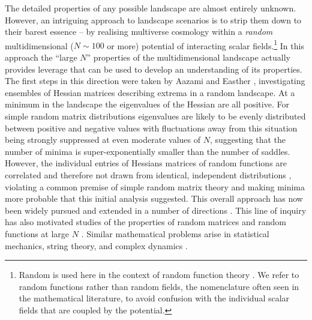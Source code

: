 \documentclass[12pt]{article}
\begin{document}
The detailed properties of any possible landscape are almost entirely unknown.  However, an intriguing approach to landscape scenarios is to strip them down to their barest essence -- by realising multiverse cosmology within a {\em random\/} multidimensional ($N\sim100$ or more) potential of interacting scalar fields.\footnote{Random is used here in the  context of random function theory \cite{GRF1, GRF2, GRF3}.  We refer to random functions rather than random fields, the nomenclature often seen in the mathematical literature, to avoid confusion with the individual scalar fields that are coupled by the potential.}  In this approach the ``large $N$'' properties of the multidimensional landscape actually provides leverage that can be used to develop an understanding of its properties. The first steps in this direction were taken by Aazami and Easther \cite{Aazami2006}, investigating ensembles of Hessian matrices describing extrema in a random landscape. At  a minimum in the landscape the eigenvalues of the Hessian are all positive. For simple random matrix distributions eigenvalues are likely to be evenly distributed between positive and negative values with fluctuations away from this situation being strongly suppressed at even moderate values of $N$, suggesting that the number of minima is super-exponentially smaller than the number of saddles. However, the individual entries of Hessians matrices of random functions are correlated and therefore not drawn from identical, independent distributions \cite{Battefeld2012,Easther2016}, violating a common premise of simple random matrix theory and making minima more probable that this initial analysis suggested.  This overall approach has now been widely pursued and extended in a number of directions \cite{Easther2006, Frazer2011, Henry2009, Marsh2013, Agarwal2011,Yang2012,Masoumi2016,Yamada2018}. This line of inquiry has also motivated studies of the properties of random matrices and random functions at large $N$ \cite{Bray2007,Dean2008,Majumdar2009,Bachlechner2014,Battefeld2012,Fyodorov2013,Masoumi2017}. Similar mathematical problems arise in statistical mechanics, string theory, and complex dynamics \cite{Fyodorov2004,Douglas2004,Douglas2006,Fyodorov2007,Fyodorov2012,Fyodorov2018,Ros2019}.

\end{document}

